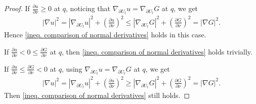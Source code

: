 \documentclass[10pt,a4paper]{amsart}
\begin{document}
\begin{proof}
    If $\frac{\partial u}{\partial\nu}\geq 0$ at $q$, noticing that $\nabla_{\partial U_t}u=\nabla_{\partial U_t}G$ at $q$, we get
    \begin{align*}
        |\nabla u|^2
        =|\nabla_{\partial U_t}u|^2
        +\left(\frac{\partial u}{\partial\nu}\right)^2
        \leq 
        |\nabla_{\partial U_t}G|^2
        +\left(\frac{\partial G}{\partial\nu}\right)^2
        =|\nabla G|^2.
    \end{align*}
    Hence \cref{ineq. comparison of normal derivatives} holds in this case.

    If $\frac{\partial u}{\partial\nu}<0\leq \frac{\partial G}{\partial\nu}$ at $q$, then \cref{ineq. comparison of normal derivatives} holds trivially.

    If $\frac{\partial u}{\partial\nu}
    \leq \frac{\partial G}{\partial\nu}<0$ at $q$, using $\nabla_{\partial U_t}u=\nabla_{\partial U_t}G$ at $q$, we get
    \begin{align*}
        |\nabla u|^2
        =|\nabla_{\partial U_t}u|^2
        +\left(\frac{\partial u}{\partial\nu}\right)^2
        \geq 
        |\nabla_{\partial U_t}G|^2
        +\left(\frac{\partial G}{\partial\nu}\right)^2
        =|\nabla G|^2.
    \end{align*}
    Then \cref{ineq. comparison of normal derivatives} still holds.


\end{proof}
\end{document}
